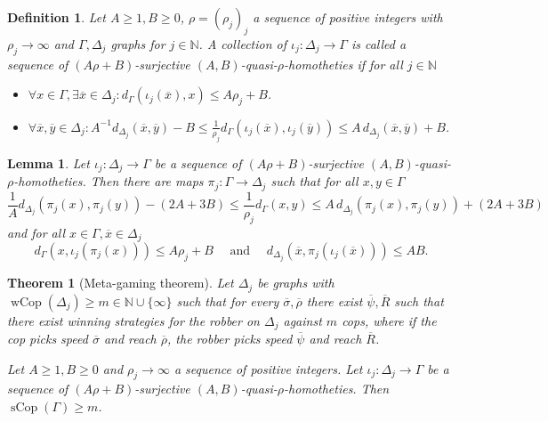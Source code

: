 \documentclass[10pt,a4paper]{amsart}
\newtheorem{definition}{Definition}
\newtheorem{lemma}{Lemma}
\newtheorem{theorem}{Theorem}
\renewcommand{\geq}{\geqslant}
\renewcommand{\leq}{\leqslant}
\newcommand{\sCop}{\operatorname{sCop}}
\newcommand{\wCop}{\operatorname{wCop}}
\begin{document}
\begin{definition}\label{def:quasi-homothety-seq}
    Let $A\geq 1, B\geq 0$, $\rho = (\rho_j)_j$ a sequence of positive integers with $\rho_j \to \infty$ and $\Gamma,\Delta_j$ graphs for $j\in \mathbb{N}$. A collection of $\iota_j \colon \Delta_j \to \Gamma$ is called a \emph{sequence of $(A\rho + B)$-surjective $(A,B)$-quasi-$\rho$-homotheties} if for all $j\in \mathbb{N}$
\begin{itemize}
    \item [(1)]  $\forall x \in \Gamma , \exists \overline{x} \in \Delta_j \colon
    d_{\Gamma}(\iota_j(\overline{x}),x) \leq A\rho_j + B$.

    \item [(2)] $\forall \overline{x}, \overline{y} \in \Delta_j \colon
    A^{-1}d_{\Delta_j}(\overline{x},\overline{y})- B \leq \frac{1}{\rho_j}d_{\Gamma}(\iota_j(\overline{x}), \iota_j(\overline{y})) \leq A \, d_{\Delta_j}(\overline{x},\overline{y}) + B $.
\end{itemize}
\end{definition}

\begin{lemma} \label{lem:quasi-homothety-seq}
    Let $\iota_j \colon \Delta_j \to \Gamma$ be a sequence of $(A\rho+B)$-surjective $(A,B)$-quasi-$\rho$-homotheties. Then there are maps $\pi_j \colon \Gamma \to \Delta_j $ such that for all $x,y \in \Gamma$
     $$
    \frac{1}{A} d_{\Delta_j}(\pi_j(x),\pi_j(y)) - (2A+3B) \leq \frac{1}{\rho_j} d_{\Gamma}(x,y) \leq A\, d_{\Delta_j}(\pi_j(x),\pi_j(y)) + (2A + 3B)
    $$
    and for all $x\in \Gamma , \overline{x} \in \Delta_j$
    $$
    d_{\Gamma}(x,\iota_j(\pi_j(x))) \leq A\rho_j+ B  \quad \text{ and } \quad d_{\Delta_j}(\overline{x}, \pi_j(\iota_j(\overline{x}))) \leq AB.
    $$
\end{lemma}

\begin{theorem}[Meta-gaming theorem]\label{thm:meta-gaming}
    Let $\Delta_j$ be graphs with $\wCop(\Delta_j) \geq m \in \mathbb{N}\cup \{\infty\}$ such that for every $\overline{\sigma}, \overline{\rho}$ there exist $\overline{\psi}, \overline{R}$ such that there exist winning strategies for the robber on $\Delta_j$ against $m$ cops, where if the cop picks speed \(\overline{\sigma}\) and reach \(\overline{\rho}\), the robber picks speed $\overline{\psi}$ and reach $\overline{R}$. 
    
    Let $A\geq 1, B\geq 0$ and $\rho_j \to \infty$ a sequence of positive integers. Let $\iota_j \colon \Delta_j \to \Gamma$ be a sequence of $(A\rho+B)$-surjective $(A,B)$-quasi-$\rho$-homotheties. Then $\sCop(\Gamma)  \geq m$.
\end{theorem}
\end{document}
